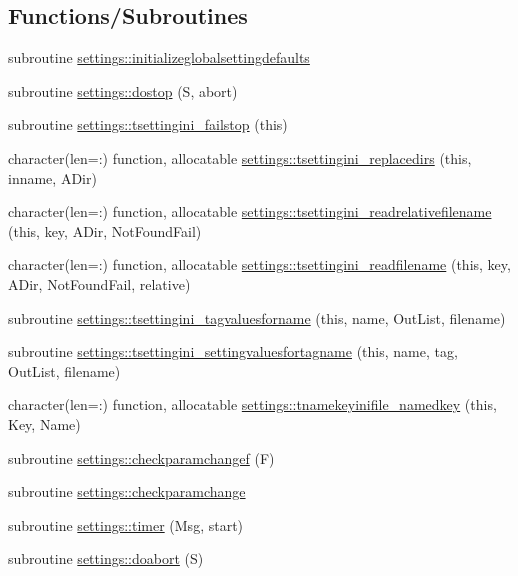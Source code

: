\subsection*{Functions/\+Subroutines}
\begin{DoxyCompactItemize}
\item 
subroutine \mbox{\hyperlink{namespacesettings_a10f55aa94b2ab604c1c3769a46fc6981}{settings\+::initializeglobalsettingdefaults}}
\item 
subroutine \mbox{\hyperlink{namespacesettings_a3747d2293e80aacbc1e756c2d26fc75f}{settings\+::dostop}} (S, abort)
\item 
subroutine \mbox{\hyperlink{namespacesettings_a6535550ffec6e7b81fcb60e053ea87b6}{settings\+::tsettingini\+\_\+failstop}} (this)
\item 
character(len=\+:) function, allocatable \mbox{\hyperlink{namespacesettings_a3b2429bfa74ea486689b09597adc9791}{settings\+::tsettingini\+\_\+replacedirs}} (this, inname, A\+Dir)
\item 
character(len=\+:) function, allocatable \mbox{\hyperlink{namespacesettings_a9fe4c031e947a169af96d96be88df87b}{settings\+::tsettingini\+\_\+readrelativefilename}} (this, key, A\+Dir, Not\+Found\+Fail)
\item 
character(len=\+:) function, allocatable \mbox{\hyperlink{namespacesettings_aa7bf4212045f11786b51f9cf5fe34ffb}{settings\+::tsettingini\+\_\+readfilename}} (this, key, A\+Dir, Not\+Found\+Fail, relative)
\item 
subroutine \mbox{\hyperlink{namespacesettings_ad76733b3c1bf3cec0d9401ce6d924a38}{settings\+::tsettingini\+\_\+tagvaluesforname}} (this, name, Out\+List, filename)
\item 
subroutine \mbox{\hyperlink{namespacesettings_a25f07dfd89b1bd5d8754f0c08c0077ef}{settings\+::tsettingini\+\_\+settingvaluesfortagname}} (this, name, tag, Out\+List, filename)
\item 
character(len=\+:) function, allocatable \mbox{\hyperlink{namespacesettings_a5cc488a2d56e898983e233e99a14cee0}{settings\+::tnamekeyinifile\+\_\+namedkey}} (this, Key, Name)
\item 
subroutine \mbox{\hyperlink{namespacesettings_a7530516bc4d95e285559b9952d6f0dc2}{settings\+::checkparamchangef}} (F)
\item 
subroutine \mbox{\hyperlink{namespacesettings_abd4643446df7076be97337eb9aa2f2e9}{settings\+::checkparamchange}}
\item 
subroutine \mbox{\hyperlink{namespacesettings_aae1de2bfeb89f23588e7f18024be2a44}{settings\+::timer}} (Msg, start)
\item 
subroutine \mbox{\hyperlink{namespacesettings_afa3df86ab753e05244ab370242ab2e5a}{settings\+::doabort}} (S)
\end{DoxyCompactItemize}
